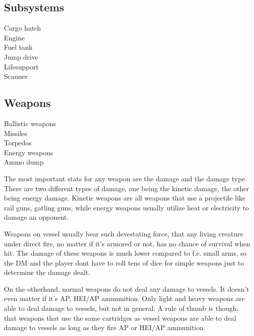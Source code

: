 \subsection{Subsystems}
\label{sub:Vessel-Subsystems}

\begin{description}
  \item[Cargo hatch]
  \item[Engine]
  \item[Fuel tank]
  \item[Jump drive]
  \item[Lifesupport]
  \item[Scanner]
\end{description}

\subsection{Weapons}
\label{sub:Vessel-Weapons}

\begin{description}
  \item[Ballistic weapons]
  \item[Missiles]
  \item[Torpedos]
  \item[Energy weapons]
  \item[Ammo dump]
\end{description}

The most important stats for any weapon are the damage and the damage type. There are two different types of damage, one being the kinetic damage, the other being energy damage. Kinetic weapons are all weapons that use a projectile like rail guns, gatling guns, while energy weapons usually utilize heat or electricity to damage an opponent.

Weapons on vessel usually bear such devestating force, that any living creature under direct fire, no matter if it's armored or not, has no chance of survival when hit. The damage of these weapons is much lower compared to f.e. small arms, so the DM and the player dont have to roll tens of dice for simple weapons just to determine the damage dealt.

On the otherhand, normal weapons do not deal any damage to vessels. It doesn't even matter if it's AP, HEI/AP ammunition. Only light and heavy weapons are able to deal damage to vessels, but not in general. A rule of thumb is though, that weapons that use the same cartridges as vessel weapons are able to deal damage to vessels as long as they fire AP or HEI/AP ammunition.

